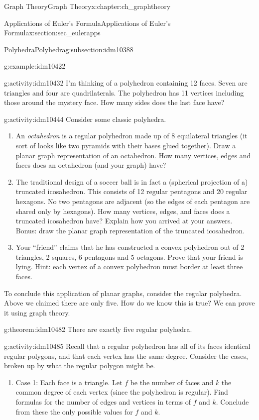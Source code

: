 \documentclass[oneside,10pt,]{book}
\numberwithin{equation}{chapter}
\begin{document}
\begin{chapterptx}{Graph Theory}{}{Graph Theory}{}{}{x:chapter:ch_graphtheory}
\begin{sectionptx}{Applications of Euler's Formula}{}{Applications of Euler's Formula}{}{}{x:section:sec_eulerapps}
\begin{subsectionptx}{Polyhedra}{}{Polyhedra}{}{}{g:subsection:idm10388}
\begin{example}{}{g:example:idm10422}
\end{example}
\begin{activity}{}{g:activity:idm10432}%
I'm thinking of a polyhedron containing 12 faces. Seven are triangles and four are quadrilaterals. The polyhedron has 11 vertices including those around the mystery face. How many sides does the last face have?%
\end{activity}
\begin{activity}{}{g:activity:idm10444}%
Consider some classic polyhedra.%
\begin{enumerate}[font=\bfseries,label=(\alph*),ref=\alph*]
\item{}An \emph{octahedron} is a regular polyhedron made up of 8 equilateral triangles (it sort of looks like two pyramids with their bases glued together). Draw a planar graph representation of an octahedron. How many vertices, edges and faces does an octahedron (and your graph) have?%
\item{}The traditional design of a soccer ball is in fact a (spherical projection of a) truncated icosahedron. This consists of 12 regular pentagons and 20 regular hexagons. No two pentagons are adjacent (so the edges of each pentagon are shared only by hexagons). How many vertices, edges, and faces does a truncated icosahedron have? Explain how you arrived at your answers. Bonus: draw the planar graph representation of the truncated icosahedron.%
\item{}Your ``friend'' claims that he has constructed a convex polyhedron out of 2 triangles, 2 squares, 6 pentagons and 5 octagons. Prove that your friend is lying. Hint: each vertex of a convex polyhedron must border at least three faces.%
\end{enumerate}
\end{activity}
To conclude this application of planar graphs, consider the regular polyhedra. Above we claimed there are only five. How do we know this is true? We can prove it using graph theory.%
\begin{theorem}{}{}{g:theorem:idm10482}%
There are exactly five regular polyhedra.%
\end{theorem}
\begin{activity}{}{g:activity:idm10485}%
Recall that a regular polyhedron has all of its faces identical regular polygons, and that each vertex has the same degree. Consider the cases, broken up by what the regular polygon might be.%
\begin{enumerate}[font=\bfseries,label=(\alph*),ref=\alph*]
\item{}Case 1: Each face is a triangle.  Let \(f\) be the number of faces and \(k\) the common degree of each vertex (since the polyhedron is regular).  Find formulas for the number of edges and vertices in terms of \(f\) and \(k\).  Conclude from these the only possible values for \(f\) and \(k\).%

\end{enumerate}
\end{activity}
\end{subsectionptx}
\end{sectionptx}
\end{chapterptx}
\end{document}
